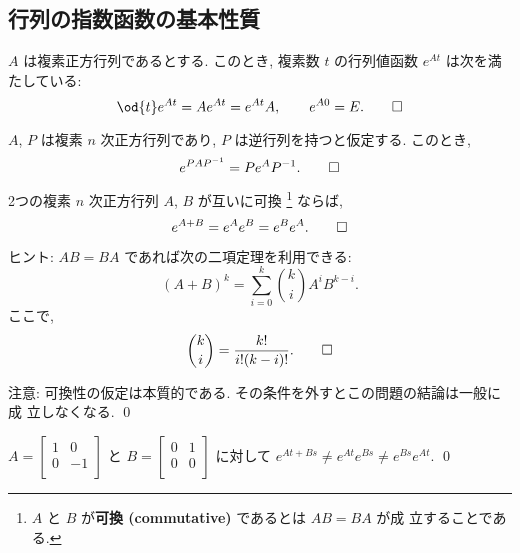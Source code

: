 \documentclass[12pt,twoside]{jarticle}
\begin{document}
\subsection{行列の指数函数の基本性質}
\label{sec:sec-exp-properties}


\begin{question}
  $A$ は複素正方行列であるとする. 
  このとき, 複素数 $t$ の行列値函数 $e^{At}$ は次を満たしている:
  \begin{equation*}
    \od{t}e^{At} = A e^{At} = e^{At} A,
    \qquad e^{A0} = E.
    \qed
  \end{equation*}
\end{question}


\begin{question}
  $A$, $P$ は複素 $n$ 次正方行列であり, $P$ は逆行列を持つと仮定する.
  このとき,
  \begin{equation*}
    e^{PAP^{-1}} = P e^A P^{-1}.
    \qed
  \end{equation*}
\end{question}


\begin{question}\label{q:exp(A+B)}
  2つの複素 $n$ 次正方行列 $A$, $B$ が互いに可換%
  \footnote{$A$ と $B$ が{\bf 可換 (commutative)} であるとは $AB = BA$ が成
    立することである.}%
  ならば,
  \begin{equation*}
    e^{A+B} = e^A e^B = e^B e^A.
    \qed
  \end{equation*}
\end{question}

\noindent
ヒント: $AB=BA$ であれば次の二項定理を利用できる:
\begin{equation*}
  (A + B)^k = \sum_{i=0}^k \binom{k}{i} A^i B^{k-i}.
\end{equation*}
ここで,
\begin{equation*}
  \binom{k}{i} = \frac{k!}{i!(k-i)!}.
\qed
\end{equation*}

\medskip
\noindent 
注意: 可換性の仮定は本質的である.  その条件を外すとこの問題の結論は一般に成
立しなくなる.
\qed


\begin{question}
  \(
    A =
    \begin{bmatrix}
      1 & 0 \\
      0 & -1 \\
    \end{bmatrix}
  \) と %
  \(
    B =
    \begin{bmatrix}
      0 & 1 \\
      0 & 0 \\
    \end{bmatrix}
  \) に対して $e^{At+Bs}\ne e^{At} e^{Bs} \ne e^{Bs} e^{At}$.
  \qed
\end{question}
\end{document}

